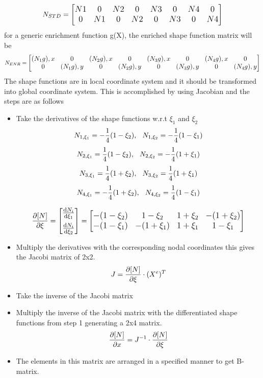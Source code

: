\documentclass[fleqn, 12.5pt,a4paper]{report}
\newcommand\tab[1][1cm]{\hspace*{#1}}
\begin{document}
$$
N_{STD} = \large \begin{bmatrix}
N1 & 0 & N2 & 0 & N3 & 0 & N4 & 0\\
0 & N1 & 0 & N2 & 0 & N3 & 0 & N4\\
\end{bmatrix} \large
$$
\newline
for a generic enrichment function g(X), the enriched shape function matrix\cite{khoei2014extended} will be
$$
N_{ENR} = \large \begin{bmatrix}
(N_1g),x & 0 & (N_2g),x & 0 & (N_3g),x & 0 & (N_4g),x & 0 \\
0 & (N_1g),y & 0 & (N_2g),y & 0 &(N_3g),y & 0 & (N_4g),y\\
\end{bmatrix} \large
$$
The shape functions are in local coordinate system and it should be transformed into global coordinate system. This is accomplished by using Jacobian \cite{khoei2014extended} and the steps are as follows
\begin{itemize}
    \item Take the derivatives of the shape functions w.r.t $\xi_1$ and $\xi_2$
    $$N_{1,\xi_1}= -\frac{1}{4}(1-\xi_2), \tab[0.25cm] N_{1,\xi_2}= - \frac{1}{4}(1-\xi_1)$$
    $$N_{2,\xi_1}=  \frac{1}{4}(1-\xi_2),  \tab[0.25cm] N_{2,\xi_2}= - \frac{1}{4}(1+\xi_1)$$
    $$N_{3,\xi_1}=  \frac{1}{4}(1+\xi_2),  \tab[0.25cm] N_{3,\xi_2}=  \frac{1}{4}(1+\xi_1)$$
    $$N_{4,\xi_1}= -\frac{1}{4}(1+\xi_2), \tab[0.25cm] N_{4,\xi_2}=  \frac{1}{4}(1-\xi_1)$$
    
    $$
    \pdv{[N]}{\xi} = \large \begin{bmatrix} 
    \dv{N_i} {\xi_1} \\[7pt]
    \dv{N_i} {\xi_2} \\
    \end{bmatrix} \large
    =
    \begin{bmatrix}
    -(1-\xi_2) & 1-\xi_2 & 1+\xi_2 & -(1+\xi_2) \\
    -(1-\xi_1) & -(1+\xi_1) & 1+\xi_1 & 1 - \xi_1 \\
    \end{bmatrix}
    $$
    \item Multiply the derivatives with the corresponding nodal coordinates this gives the Jacobi matrix of 2x2.
    $$
    J = \pdv{[N]}{\xi} \cdot (X^e)^T \\
    $$
    \item Take the inverse of the Jacobi matrix
    \item Multiply the inverse of the Jacobi matrix with the differentiated shape functions from step 1 generating a 2x4 matrix.
    $$
    \pdv{[N]}{x} = J^{-1} \cdot \pdv{[N]}{\xi}
    $$
    \item The elements in this matrix are arranged in a specified manner to get B-matrix.  
    
\end{itemize}
\end{document}

